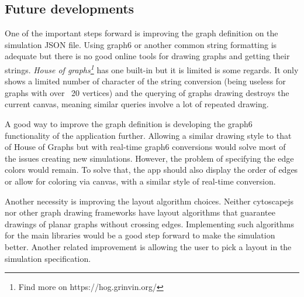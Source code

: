 \subsection*{Future developments}

One of the important steps forward is improving the graph definition on the simulation JSON file. Using graph6 or another common string formatting is adequate but there is no good online tools for drawing graphs and getting their strings. \textit{House of graphs\footnote{Find more on https://hog.grinvin.org/}} has one built-in but it is limited is some regards. It only shows a limited number of character of the string conversion (being useless for graphs with over ~20 vertices) and the querying of graphs drawing destroys the current canvas, meaning similar queries involve a lot of repeated drawing.

A good way to improve the graph definition is developing the graph6 functionality of the application further. Allowing a similar drawing style to that of House of Graphs but with real-time graph6 conversions would solve most of the issues creating new simulations. However, the problem of specifying the edge colors would remain. To solve that, the app should also display the order of edges or allow for coloring via canvas, with a similar style of real-time conversion.

Another necessity is improving the layout algorithm choices. Neither cytoscapejs nor other graph drawing frameworks have layout algorithms that guarantee drawings of planar graphs without crossing edges. Implementing such algorithms for the main libraries would be a good step forward to make the simulation better. Another related improvement is allowing the user to pick a layout in the simulation specification.








